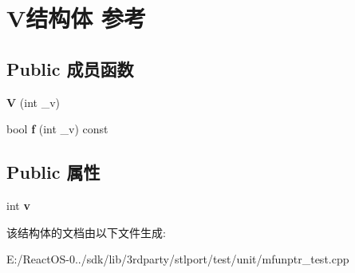 \hypertarget{struct_v}{}\section{V结构体 参考}
\label{struct_v}
\subsection*{Public 成员函数}
\begin{DoxyCompactItemize}
\item 
\mbox{\label{struct_v_aeb40360007faac6b054307d8a34431df}} 
{\bfseries V} (int \+\_\+v)
\item 
\mbox{\label{struct_v_aa4b0cee10a9ac9552722ff479bf3577c}} 
bool {\bfseries f} (int \+\_\+v) const
\end{DoxyCompactItemize}
\subsection*{Public 属性}
\begin{DoxyCompactItemize}
\item 
\mbox{\label{struct_v_a7c7e4d16d0068ad4be8604ce834015c5}} 
int {\bfseries v}
\end{DoxyCompactItemize}


该结构体的文档由以下文件生成\+:\begin{DoxyCompactItemize}
\item 
E\+:/\+React\+O\+S-\/0../sdk/lib/3rdparty/stlport/test/unit/mfunptr\+\_\+test.\+cpp\end{DoxyCompactItemize}
